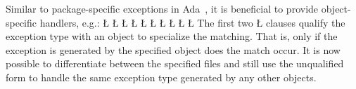 \documentclass[openright,twoside]{report}
\begin{document}
Similar to package-specific exceptions in Ada~\cite{adaref}, it is beneficial to provide object-specific handlers, e.g.:
\LGinlinefalse\LGbegin\lgrinde
\L{}
\L{\LB{}}
\L{\LB{}}
\L{}
\L{\LB{}}
\CE{}\L{}
\L{\LB{}}
\CE{}\L{}
\L{\LB{}}
\CE{}\L{\LB{\}}}
\endlgrinde\LGend
The first two \LGinlinetrue\LGbegin\lgrinde\L{}\endlgrinde\LGend{} clauses qualify the exception type with an object to specialize the matching.
That is, only if the exception is generated by the specified object does the match occur.
It is now possible to differentiate between the specified files and still use the unqualified form to handle the same exception type generated by any other objects.
\end{document}
